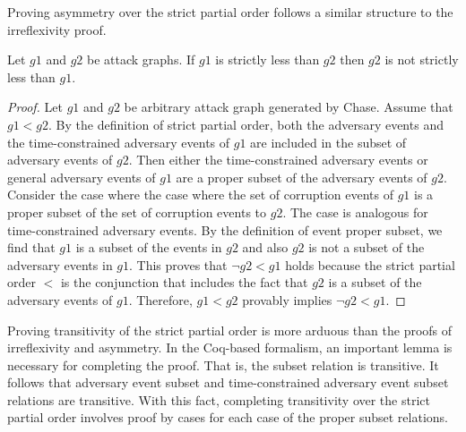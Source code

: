 \documentclass[runningheads]{llncs}
\theoremstyle{definition}
\begin{document}
\noindent Proving asymmetry over the strict partial order follows a similar structure to the irreflexivity proof. 

\begin{theorem}
    Let $g1$ and $g2$ be attack graphs. If $g1$ is strictly less than $g2$ then $g2$ is not strictly less than $g1$. 
\end{theorem}
\begin{proof}
    Let $g1$ and $g2$ be arbitrary attack graph generated by Chase. Assume that $g1 < g2$. By the definition of strict partial order, both the adversary events and the time-constrained adversary events of $g1$ are included in the subset of adversary events of $g2$. Then either the time-constrained adversary events or general adversary events of $g1$ are a proper subset of the adversary events of $g2$. Consider the case where the case where the set of corruption events of $g1$ is a proper subset of the set of corruption events to $g2$. The case is analogous for time-constrained adversary events.  By the definition of event proper subset, we find that $g1$ is a subset of the events in $g2$ and also $g2$ is not a subset of the adversary events in $g1$. This proves that $\neg g2 < g1$ holds because the strict partial order $<$ is the conjunction that includes the fact that $g2$ is a subset of the adversary events of $g1$. Therefore, $g1 < g2$ provably implies $\neg g2 < g1$. 
\end{proof}

\noindent Proving transitivity of the strict partial order is more arduous than the proofs of irreflexivity and asymmetry. In the Coq-based formalism, an important lemma is necessary for completing the proof. That is, the subset relation is transitive. It follows that adversary event subset and time-constrained adversary event subset relations are transitive. With this fact, completing transitivity over the strict partial order involves proof by cases for each case of the proper subset relations.
\end{document}
